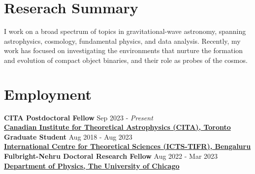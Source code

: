 		
		\section{Reserach Summary}
		I work on a broad spectrum of topics in gravitational-wave astronomy, spanning astrophysics, cosmology, fundamental physics, and data analysis. Recently, my work has focused on investigating the environments that nurture the formation and evolution of compact object binaries, and their role as probes of the cosmos. 
		
		\section{Employment}
        \textbf{CITA Postdoctoral Fellow} \hfill Sep 2023 - \textit{Present}
		\\
            \vspace{0.4em}\textbf{\href{https://www.cita.utoronto.ca/}{Canadian Institute for Theoretical Astrophysics (CITA), Toronto}}\\
            \textbf{Graduate Student} \hfill Aug 2018 - Aug 2023
		\\
		\vspace{0.4em}\textbf{\href{https://www.icts.res.in/}{International Centre for Theoretical Sciences (ICTS-TIFR), Bengaluru}}\\
		\textbf{Fulbright-Nehru Doctoral Research Fellow } \hfill Aug 2022 - Mar 2023
		\\
		\textbf{\href{https://physics.uchicago.edu/}{Department of Physics, The University of Chicago}}
		
		
		
